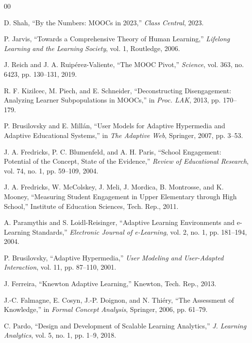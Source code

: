 \documentclass[conference]{IEEEtran}
\begin{document}
\begin{thebibliography}{00}

 D. Shah, ``By the Numbers: MOOCs in 2023,'' \textit{Class Central}, 2023.

 P. Jarvis, ``Towards a Comprehensive Theory of Human Learning,'' \textit{Lifelong Learning and the Learning Society}, vol. 1, Routledge, 2006.

 J. Reich and J. A. Ruipérez-Valiente, ``The MOOC Pivot,'' \textit{Science}, vol. 363, no. 6423, pp. 130--131, 2019.

 R. F. Kizilcec, M. Piech, and E. Schneider, ``Deconstructing Disengagement: Analyzing Learner Subpopulations in MOOCs,'' in \textit{Proc. LAK}, 2013, pp. 170--179.

 P. Brusilovsky and E. Millán, ``User Models for Adaptive Hypermedia and Adaptive Educational Systems,'' in \textit{The Adaptive Web}, Springer, 2007, pp. 3--53.

 J. A. Fredricks, P. C. Blumenfeld, and A. H. Paris, ``School Engagement: Potential of the Concept, State of the Evidence,'' \textit{Review of Educational Research}, vol. 74, no. 1, pp. 59--109, 2004.

 J. A. Fredricks, W. McColskey, J. Meli, J. Mordica, B. Montrosse, and K. Mooney, ``Measuring Student Engagement in Upper Elementary through High School,'' Institute of Education Sciences, Tech. Rep., 2011.

 A. Paramythis and S. Loidl-Reisinger, ``Adaptive Learning Environments and e-Learning Standards,'' \textit{Electronic Journal of e-Learning}, vol. 2, no. 1, pp. 181--194, 2004.

 P. Brusilovsky, ``Adaptive Hypermedia,'' \textit{User Modeling and User-Adapted Interaction}, vol. 11, pp. 87--110, 2001.

 J. Ferreira, ``Knewton Adaptive Learning,'' Knewton, Tech. Rep., 2013.

 J.-C. Falmagne, E. Cosyn, J.-P. Doignon, and N. Thiéry, ``The Assessment of Knowledge,'' in \textit{Formal Concept Analysis}, Springer, 2006, pp. 61--79.

 C. Pardo, ``Design and Development of Scalable Learning Analytics,'' \textit{J. Learning Analytics}, vol. 5, no. 1, pp. 1--9, 2018.


\end{thebibliography}
\end{document}
